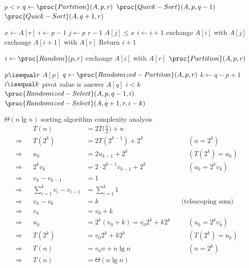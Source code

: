 \documentclass[11pt]{article}
\theoremstyle{definition}
\begin{document}
\begin{codebox}
  \li \If \(p < r\) \Then
    \li \(q \gets \proc{Partition}(A,p,r)\)
    \li \(\proc{Quick-Sort}(A,p,q-1)\)
    \li \(\proc{Quick-Sort}(A,q+1,r)\)
\end{codebox}

\begin{codebox}
  \li \(x \gets A[r]\)
  \li \(i \gets p-1\)
  \li \For \(j \gets p\) \To \(r-1\) \Do
    \li \If \(A[j] \leq x\) \Then 
      \li \(i \gets i+1\)
      \li exchange \(A[i]\) with \(A[j]\) \End \End
  \li exchange \(A[i+1]\) with \(A[r]\)
  \li Return \(i+1\)
\end{codebox}

\begin{codebox}
  \li \(i \gets \proc{Random}(p,r)\)
  \li exchange \(A[i]\) with \(A[r]\)
  \li \Return \(\proc{Partition}(A,p,r)\)
\end{codebox}

\begin{codebox}
  \li \If \(p \isequal r\) \Then 
    \li \Return \(A[p]\) \End
  \li \(q \gets \proc{Randomized-Partiton}(A,p,r)\)
  \li \(k \gets q-p+1\)
  \li \If \(i \isequal k\) \Comment pivot value is answer \Then 
    \li \Return \(A[q]\) \End
  \li \ElseIf \(i < k\)
    \li \Then \Return \(\proc{Randomized-Select}(A,p,q-1,i)\) \End
  \li \Else \Return \(\proc{Randomized-Select}(A,q+1,r,i-k)\) \End
\end{codebox}
\newpage

\(\Theta(n \lg n)\) sorting algorithm complexity analysis
\begin{align*}
  && T(n) &= 2T\Big(\frac{n}{2}\Big) + n && \\ 
  \Rightarrow && T(2^k) &= 2T(2^{k-1}) + 2^k && \quad (n = 2^k) \\ 
  \Rightarrow && u_k &= 2u_{k-1} + 2^k && \quad (T(2^k) = u_k) \\
  \Rightarrow && 2^k v_k &= 2 \cdot 2^{k-1}v_{k-1} + 2^k && \quad (u_k = 2^k v_k) \\
  \Rightarrow && v_k - v_{k-1} &= 1 && \\
  \Rightarrow && \sum_{i=1}^k v_i - v_{i-1} &= \sum_{i=1}^k 1 && \\ 
  \Rightarrow && v_k - v_0 &= k && \text{(telescoping sum)} \\
  \Rightarrow && v_k &= v_0 + k && \\
  \Rightarrow && u_k &= 2^k(v_0 + k) = v_0 2^k + k 2^k && \quad (u_k = 2^k v_k) \\
  \Rightarrow && T(2^k) &= v_0 2^k + k 2^k && \quad (T(2^k) = u_k) \\
  \Rightarrow && T(n) &= v_0n + n \lg n && \quad (n = 2^k) \\
  \Rightarrow && T(n) &= \Theta(n \lg n)
\end{align*}
\end{document}
